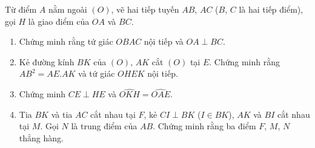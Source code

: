 \begin{ex}%
	Từ điểm $A$ nằm ngoài $(O)$, vẽ hai tiếp tuyến $AB$, $AC$ ($B$, $C$ là hai tiếp điểm), gọi $H$ là giao điểm của $OA$ và $BC$.
	\begin{enumerate}
		\item Chứng minh rằng tứ giác $OBAC$ nội tiếp và $OA \perp BC$.
		\item Kẻ đường kính $BK$ của $(O)$, $AK$ cắt $(O)$ tại $E$. Chứng minh rằng $AB^2=AE.AK$ và tứ giác $OHEK$ nội tiếp.
		\item Chứng minh $CE \perp HE$ và $\widehat{OKH} =\widehat{OAE}$.
		\item Tia $BK$ và tia $AC$ cắt nhau tại $F$, kẻ $CI \perp BK$ ($I \in BK$), $AK$ và $BI$ cắt nhau tại $M$. Gọi $N$ là trung điểm của $AB$. Chứng minh rằng ba điểm $F$, $M$, $N$ thẳng hàng.
	\end{enumerate}
\end{ex}
